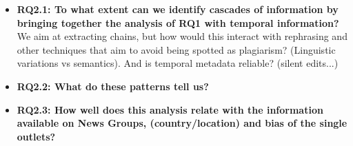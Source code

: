\vspace{12px}

\begin{itemize}
    \item \textbf{RQ2.1: To what extent can we identify cascades of information by bringing together the analysis of RQ1 with temporal information?} We aim at extracting chains, but how would this interact with rephrasing and other techniques that aim to avoid being spotted as plagiarism? (Linguistic variations vs semantics). And is temporal metadata reliable? (silent edits...)
    
    \item \textbf{RQ2.2: What do these patterns tell us?}
    
    \item \textbf{RQ2.3: How well does this analysis relate with the information available on News Groups, (country/location) and bias of the single outlets?}
    
\end{itemize}